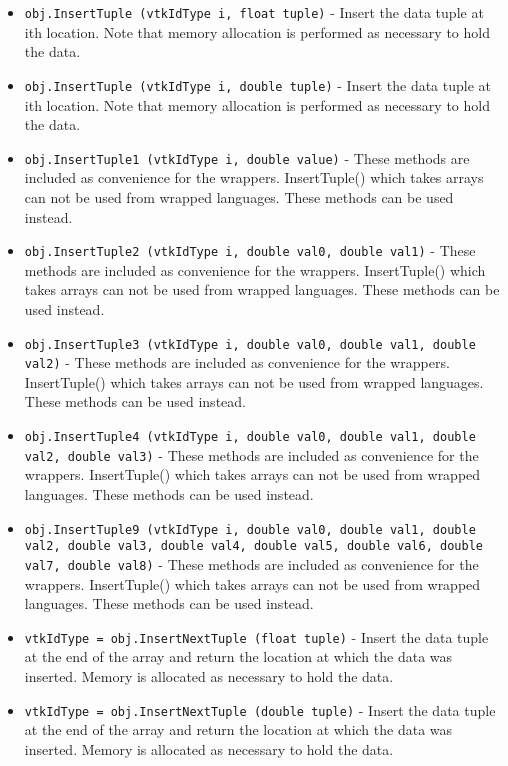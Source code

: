 \begin{itemize}
\item  \verb|obj.InsertTuple (vtkIdType i, float tuple)| -  Insert the data tuple at ith location. Note that memory allocation
 is performed as necessary to hold the data.

\item  \verb|obj.InsertTuple (vtkIdType i, double tuple)| -  Insert the data tuple at ith location. Note that memory allocation
 is performed as necessary to hold the data.

\item  \verb|obj.InsertTuple1 (vtkIdType i, double value)| -  These methods are included as convenience for the wrappers.
 InsertTuple() which takes arrays can not be 
 used from wrapped languages. These methods can be used instead.

\item  \verb|obj.InsertTuple2 (vtkIdType i, double val0, double val1)| -  These methods are included as convenience for the wrappers.
 InsertTuple() which takes arrays can not be 
 used from wrapped languages. These methods can be used instead.

\item  \verb|obj.InsertTuple3 (vtkIdType i, double val0, double val1, double val2)| -  These methods are included as convenience for the wrappers.
 InsertTuple() which takes arrays can not be 
 used from wrapped languages. These methods can be used instead.

\item  \verb|obj.InsertTuple4 (vtkIdType i, double val0, double val1, double val2, double val3)| -  These methods are included as convenience for the wrappers.
 InsertTuple() which takes arrays can not be 
 used from wrapped languages. These methods can be used instead.

\item  \verb|obj.InsertTuple9 (vtkIdType i, double val0, double val1, double val2, double val3, double val4, double val5, double val6, double val7, double val8)| -  These methods are included as convenience for the wrappers.
 InsertTuple() which takes arrays can not be 
 used from wrapped languages. These methods can be used instead.

\item  \verb|vtkIdType = obj.InsertNextTuple (float tuple)| -  Insert the data tuple at the end of the array and return the location at
 which the data was inserted. Memory is allocated as necessary to hold
 the data.

\item  \verb|vtkIdType = obj.InsertNextTuple (double tuple)| -  Insert the data tuple at the end of the array and return the location at
 which the data was inserted. Memory is allocated as necessary to hold
 the data.


\end{itemize}
